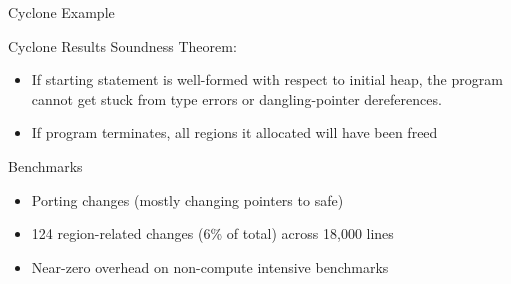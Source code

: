 \documentclass[aspectratio=169]{beamer}
\begin{document}
\begin{frame}{Cyclone Example}
\end{frame}

\begin{frame}{Cyclone Results}
Soundness Theorem:
    \begin{itemize}
        \item If starting statement is well-formed with respect to initial heap, the program cannot get stuck from type errors or dangling-pointer dereferences. 
        \item If program terminates, all regions it allocated will have been freed
    \end{itemize}
Benchmarks
    \begin{itemize}
        \item Porting changes (mostly changing pointers to safe)
        \item 124 region-related changes (6\% of total) across 18,000 lines
        \item Near-zero overhead on non-compute intensive benchmarks %
    \end{itemize}
\end{frame}
\end{document}
